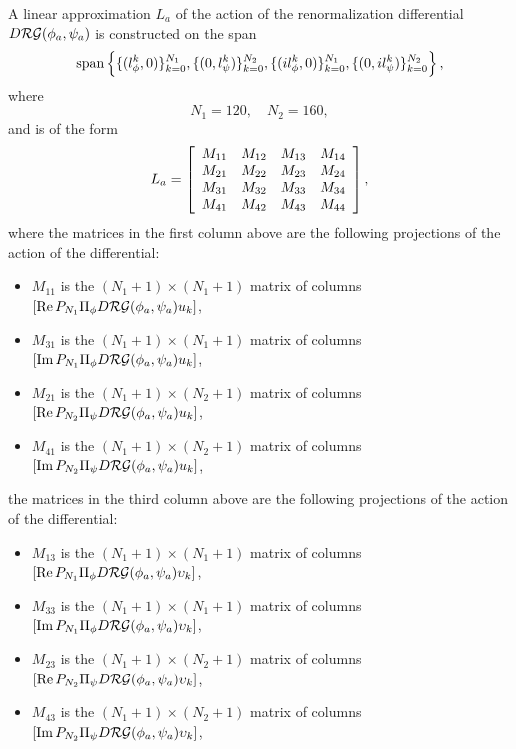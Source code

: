 A linear approximation $L_a$ of the action of the renormalization differential  $D \mathcal{RG}(\phi_a,\psi_a)$ is constructed on the span
$${\rm span} \left\{ \{ (l_\phi^k,0) \}_{k=0}^{N_1},\{(0,l_\psi^k)\}_{k=0}^{N_2},\{(i l_\phi^k,0)\}_{k=0}^{N_1},\{(0,i l_\psi^k)\}_{k=0}^{N_2} \right\},$$
where 
$$N_1=120, \quad N_2=160,$$
and is of the form 
$$L_a=\left[ \begin{array}{c c c c}
M_{1 1} & M_{1 2} & M_{1 3} & M_{1 4} \\
M_{2 1} & M_{2 2} & M_{2 3} & M_{2 4} \\
M_{3 1} & M_{3 2} & M_{3 3} & M_{3 4} \\
M_{4 1} & M_{4 2} & M_{4 3} & M_{4 4}
\end{array}
\right],
$$
where the matrices in the first column above are the following projections of the action of the differential:
\begin{itemize}
\item[$\bullet$] $M_{1 1}$ is the $(N_1+1) \times (N_1+1)$ matrix of columns $ \left[ \operatorname{Re} P_{N_1} \Pi_\phi  D \mathcal{RG}(\phi_a,\psi_a) u_k \right]$,
\item[$\bullet$] $M_{3 1}$ is the $(N_1+1) \times (N_1+1)$ matrix of columns $ \left[ \operatorname{Im} P_{N_1} \Pi_\phi  D \mathcal{RG}(\phi_a,\psi_a) u_k \right]$,
\item[$\bullet$] $M_{2 1}$ is the $(N_1+1) \times (N_2+1)$ matrix of columns
$ \left[ \operatorname{Re} P_{N_2} \Pi_\psi  D \mathcal{RG}(\phi_a,\psi_a) u_k \right]$,
\item[$\bullet$] $M_{4 1}$ is the $(N_1+1) \times (N_2+1)$ matrix of columns
$ \left[ \operatorname{Im} P_{N_2} \Pi_\psi  D \mathcal{RG}(\phi_a,\psi_a) u_k \right]$,
\end{itemize}
the matrices in the third column above are  the following projections of the action of the differential:
\begin{itemize}
\item[$\bullet$] $M_{1 3}$ is the $(N_1+1) \times (N_1+1)$ matrix of columns $ \left[ \operatorname{Re} P_{N_1} \Pi_\phi  D \mathcal{RG}(\phi_a,\psi_a) \upsilon_k \right]$,
\item[$\bullet$] $M_{3 3}$ is the $(N_1+1) \times (N_1+1)$ matrix of columns $ \left[ \operatorname{Im} P_{N_1} \Pi_\phi  D \mathcal{RG}(\phi_a,\psi_a) \upsilon_k \right]$,
\item[$\bullet$] $M_{2 3}$ is the $(N_1+1) \times (N_2+1)$ matrix of columns
$ \left[ \operatorname{Re} P_{N_2} \Pi_\psi  D \mathcal{RG}(\phi_a,\psi_a) \upsilon_k \right]$,
\item[$\bullet$] $M_{4 3}$ is the $(N_1+1) \times (N_2+1)$ matrix of columns
$ \left[ \operatorname{Im} P_{N_2} \Pi_\psi  D \mathcal{RG}(\phi_a,\psi_a) \upsilon_k \right]$,
\end{itemize}
